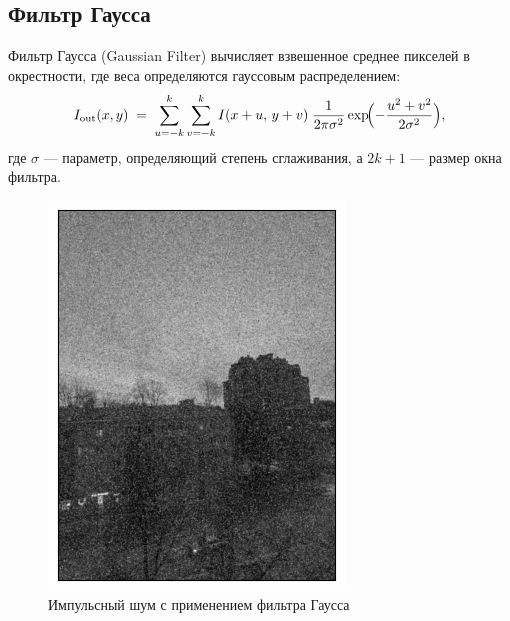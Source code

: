 \documentclass[a4paper,12pt]{article}
\begin{document}
\subsection{Фильтр Гаусса}
Фильтр Гаусса (Gaussian Filter) вычисляет взвешенное среднее пикселей в окрестности, где веса определяются гауссовым распределением:
\begin{equation}
I_{\text{out}}(x,y) \;=\;
\sum_{u=-k}^{k} \sum_{v=-k}^{k} I(x+u,\,y+v)\;
\frac{1}{2\pi\sigma^2}
\exp\!\Bigl(-\frac{u^2 + v^2}{2\sigma^2}\Bigr),
\end{equation}
где \(\sigma\) --- параметр, определяющий степень сглаживания, а \(2k+1\) --- размер окна фильтра. 
\begin{figure}[H]
    \begin{minipage}{0.49\textwidth}
        \centering \includegraphics[width=\textwidth]{results/lpf_sap_5.png}
        \caption{Импульсный шум с применением фильтра Гаусса}
    \end{minipage}\hfill
    \begin{minipage}{0.49\textwidth}

\end{minipage}
\end{figure}
\end{document}
